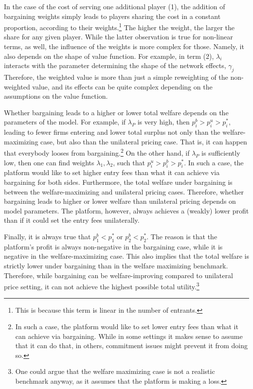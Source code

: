 \documentclass[a4paper]{article}
\begin{document}
In the case of the cost of serving one additional player (1), the addition of bargaining weights simply leads to players sharing the cost in a constant proportion, according to their weights.\footnote{
    This is because this term is linear in the number of entrants.
}
The higher the weight, the larger the share for any given player.
While the latter observation is true for non-linear terms, as well, the influence of the weights is more complex for those.
Namely, it also depends on the shape of value function.
For example, in term (2), $\lambda_i$ interacts with the parameter determining the shape of the network effects, $\gamma_j$
Therefore, the weighted value is more than just a simple reweighting of the non-weighted value, and its effects can be quite complex depending on the assumptions on the value function.

Whether bargaining leads to a higher or lower total welfare depends on the parameters of the model.
For example, if $\lambda_P$ is very high, then $p_i^b > p_i^u > p_i^*$, leading to fewer firms entering and lower total surplus not only than the welfare-maximizing case, but also than the unilateral pricing case.
That is, it can happen that everybody looses from bargaining.\footnote{
    In such a case, the platform would like to set lower entry fees than what it can achieve via bargaining.
    While in some settings it makes sense to assume that it can do that, in others, commitment issues might prevent it from doing so.
}
On the other hand, if $\lambda_P$ is sufficiently low, then one can find weights $\lambda_1, \lambda_2$, such that $p_i^u > p_i^b > p_i^*$.
In such a case, the platform would like to set higher entry fees than what it can achieve via bargaining for both sides.
Furthermore, the total welfare under bargaining is between the welfare-maximizing and unilateral pricing cases.
Therefore, whether bargaining leads to higher or lower welfare than unilateral pricing depends on model parameters.
The platform, however, always achieves a (weakly) lower profit than if it could set the entry fees unilaterally.

Finally, it is always true that $p_1^b < p_1^*$ or $p_2^b < p_2^*$.
The reason is that the platform's profit is always non-negative in the bargaining case, while it is negative in the welfare-maximizing case.
This also implies that the total welfare is strictly lower under bargaining than in the welfare maximizing benchmark.
Therefore, while bargaining can be welfare-improving compared to unilateral price setting, it can not achieve the highest possible total utility.\footnote{
    One could argue that the welfare maximizing case is not a realistic benchmark anyway, as it assumes that the platform is making a loss.
}
\end{document}
